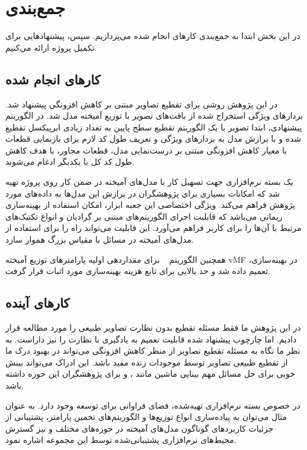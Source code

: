 \chapter{جمع‌بندی} \label{ch:conclusion}
در این بخش ابتدا به جمع‌بندی کارهای انجام شده می‌پردازیم. سپس، پیشنهادهایی برای تکمیل پروژه ارائه می‌کنیم.

\section{کارهای انجام شده}
در این پژوهش روشی برای تقطیع تصاویر مبتنی بر کاهش افزونگی پیشنهاد شد.
بردارهای ویژگی استخراج شده از بافت‌های تصویر با توزیع آمیخته
مدل شد.
در الگوریتم پیشنهادی، ابتدا تصویر با یک الگوریتم تقطیع سطح پایین به تعداد زیادی ابرپیکسل تقطیع شده و با برازش مدل به بردارهای ویژگی و تعریف طول کد لازم برای بازنمایی قطعات با معیار کاهش افزونگی مبتنی بر درست‌نمایی مدل، قطعات مجاور، با هدف کاهش طول کد کل با یکدیگر ادغام می‌شوند.



یک بسته نرم‌افزاری جهت تسهیل کار با مدل‌های آمیخته در ضمن کار روی پروژه تهیه شد که امکانات بسیاری برای پژوهشگران در برازش این مدل‌ها به داده‌های مورد پژوهش فراهم می‌کند.
ویژگی اختصاصی این جعبه ابزار، امکان استفاده از
بهینه‌سازی ریمانی می‌باشد که قابلیت اجرای الگوریتم‌های مبتنی بر گرادیان و انواع تکنیک‌های مرتبط با آن‌ها را برای کاربر فراهم می‌آورد.
این قابلیت می‌تواند راه را برای استفاده از مدل‌های آمیخته در مسائل با مقیاس بزرگ هموار سازد.

همچنین الگوریتم
~\cite{arthur_kmeans_2007}
برای مقداردهی اولیه پارامترهای توزیع آمیخته vMF در بهینه‌سازی، تعمیم داده شد و حد بالایی برای تابع هزینه بهینه‌سازی مورد اثبات قرار گرفت.



\section{کارهای آینده}
\iffalse
با توجه به تاثیر پارامتر
$\lambda$
بر اندازه قطعات ایجاد شده، احتمالا طراحی یک الگوریتم برای تنظیم انطباق‌پذیر این پارامتر به گونه‌ای که در نواحی دارای جزئیات بالا در تصویر مقدار آن کاهش یافته و در نواحی گسترده و با جزئیات کمتر، مقدار پارامتر افزایش یابد می‌تواند در کیفیت بهتر قطعات ایجاد شده تاثیرگذار باشد.
\fi

در این پژوهش ما فقط مسئله تقطیع بدون نظارت تصاویر طبیعی را مورد مطالعه قرار دادیم.
اما چارچوب پیشنهاد شده قابلیت تعمیم به یادگیری با نظارت را نیز داراست.
به نظر ما نگاه به مسئله تقطیع تصاویر از منظر کاهش افزونگی می‌تواند در بهبود درک ما از تقطیع طبیعی تصاویر توسط موجودات زنده مفید باشد.
این ادراک می‌تواند بینش خوبی برای حل مسائل مهم بینایی ماشین مانند
{}،
{} و
{}
برای پژوهشگران این حوزه داشته باشد.

در خصوص بسته نرم‌افزاری تهیه‌شده، فضای فراوانی برای توسعه وجود دارد.
به عنوان مثال می‌توان به پیاده‌سازی انواع توزیع‌ها و الگوریتم‌های تخمین پارامتر،
پشتیبانی از جزئیات کاربردهای گوناگون مدل‌های آمیخته در حوزه‌های مختلف
و نیز گسترش محیط‌های نرم‌افزاری پشتیبانی‌شده توسط این مجموعه اشاره نمود.




